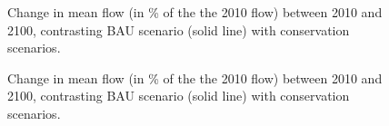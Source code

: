 {%
\begin{figure}[h!]
 \caption{Change in mean flow (in \% of the the 2010 flow) between 2010 and 2100, contrasting BAU scenario (solid line) with conservation scenarios.}
 \label{fig:flow_linear_2}
\end{figure}

\begin{figure}[h!]
 \caption{Change in mean flow (in \% of the the 2010 flow) between 2010 and 2100, contrasting BAU scenario (solid line) with conservation scenarios.}
 \label{fig:flow_radar_2}
\end{figure}

}
